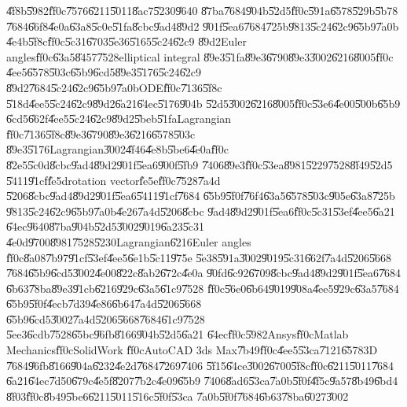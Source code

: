 \documentclass[12pt,a4paper]{article}
\begin{document}
\U{4f8b}\U{5982}\U{ff0c}\U{7576}\U{6211}\U{5011}\U{8ac7}\U{5230}\U{9640}%
\U{87ba}\U{7684}\U{904b}\U{52d5}\U{ff0c}\U{591a}\U{6578}\U{529b}\U{5b78}%
\U{7684}\U{66f8}\U{4e0a}\U{63a8}\U{5c0e}\U{51fa}\U{8cbc}\U{9ad4}\U{89d2}%
\U{901f}\U{5ea6}\U{7684}\U{725b}\U{9813}\U{5c24}\U{62c9}\U{65b9}\U{7a0b}%
\U{4e4b}\U{5f8c}\U{ff0c}\U{5c31}\U{6703}\U{5e36}\U{5165}\U{5c24}\U{62c9}%
\U{89d2}Euler angles\U{ff0c}\U{63a5}\U{8457}\U{7528}elliptical integral%
\U{89e3}\U{51fa}\U{89e3}\U{6790}\U{89e3}\U{3002}\U{6216}\U{8005}\U{ff0c}%
\U{4ee5}\U{6578}\U{503c}\U{65b9}\U{6cd5}\U{89e3}\U{5176}\U{5c24}\U{62c9}%
\U{89d2}\U{7684}\U{5c24}\U{62c9}\U{65b9}\U{7a0b}ODE\U{ff0c}\U{7136}\U{5f8c}%
\U{518d}\U{4ee5}\U{5c24}\U{62c9}\U{89d2}\U{6a21}\U{64ec}\U{5176}\U{904b}%
\U{52d5}\U{3002}\U{6216}\U{8005}\U{ff0c}\U{53e6}\U{4e00}\U{500b}\U{65b9}%
\U{6cd5}\U{662f}\U{4ee5}\U{5c24}\U{62c9}\U{89d2}\U{5beb}\U{51fa}Lagrangian%
\U{ff0c}\U{7136}\U{5f8c}\U{89e3}\U{6790}\U{89e3}\U{6216}\U{6578}\U{503c}%
\U{89e3}\U{5176}Lagrangian\U{3002}\U{4f46}\U{4e8b}\U{5be6}\U{4e0a}\U{ff0c}%
\U{82e5}\U{5c0d}\U{8cbc}\U{9ad4}\U{89d2}\U{901f}\U{5ea6}\U{900f}\U{5fb9}%
\U{7406}\U{89e3}\U{ff0c}\U{53ea}\U{8981}\U{5229}\U{7528}\U{8f49}\U{52d5}%
\U{5411}\U{91cf}\U{fe5d}rotation vector\U{fe5e}\U{ff0c}\U{7528}\U{7a4d}%
\U{5206}\U{8cbc}\U{9ad4}\U{89d2}\U{901f}\U{5ea6}\U{5411}\U{91cf}\U{7684}%
\U{65b9}\U{5f0f}\U{76f4}\U{63a5}\U{6578}\U{503c}\U{905e}\U{63a8}\U{725b}%
\U{9813}\U{5c24}\U{62c9}\U{65b9}\U{7a0b}\U{4e26}\U{7a4d}\U{5206}\U{8cbc}%
\U{9ad4}\U{89d2}\U{901f}\U{5ea6}\U{ff0c}\U{5c31}\U{53ef}\U{4ee5}\U{6a21}%
\U{64ec}\U{9640}\U{87ba}\U{904b}\U{52d5}\U{3002}\U{9019}\U{6a23}\U{5c31}%
\U{4e0d}\U{9700}\U{8981}\U{7528}\U{5230}Lagrangian\U{6216}Euler angles%
\U{ff0c}\U{8a08}\U{7b97}\U{91cf}\U{53ef}\U{4ee5}\U{6e1b}\U{5c11}\U{975e}%
\U{5e38}\U{591a}\U{3002}\U{9019}\U{5c31}\U{662f}\U{7a4d}\U{5206}\U{5668}%
\U{7684}\U{65b9}\U{6cd5}\U{3002}\U{4e00}\U{822c}\U{8ab2}\U{672c}\U{4e0a}%
\U{90fd}\U{6c92}\U{6709}\U{8cbc}\U{9ad4}\U{89d2}\U{901f}\U{5ea6}\U{7684}%
\U{6b63}\U{78ba}\U{89e3}\U{91cb}\U{6216}\U{929c}\U{63a5}\U{61c9}\U{7528}%
\U{ff0c}\U{56e0}\U{6b64}\U{9019}\U{908a}\U{4ee5}\U{929c}\U{63a5}\U{7684}%
\U{65b9}\U{5f0f}\U{4ecb}\U{7d39}\U{4e86}\U{6b64}\U{7a4d}\U{5206}\U{5668}%
\U{65b9}\U{6cd5}\U{3002}\U{7a4d}\U{5206}\U{5668}\U{7684}\U{61c9}\U{7528}%
\U{5ee3}\U{6cdb}\U{7528}\U{65bc}\U{96fb}\U{8166}\U{904b}\U{52d5}\U{6a21}%
\U{64ec}\U{ff0c}\U{5982}Ansys\U{ff0c}Matlab Mechanics\U{ff0c}SolidWork%
\U{ff0c}AutoCAD 3ds Max\U{7b49}\U{ff0c}\U{4ee5}\U{53ca}\U{7121}\U{6578}3D%
\U{7684}\U{96fb}\U{8166}\U{904a}\U{6232}\U{4e2d}\U{7684}\U{7269}\U{7406}%
\U{5f15}\U{64ce}\U{3002}\U{6700}\U{5f8c}\U{ff0c}\U{6211}\U{5011}\U{7684}%
\U{6a21}\U{64ec}\U{7d50}\U{679c}\U{4e5f}\U{8207}\U{7b2c}\U{4e09}\U{65b9}%
\U{7406}\U{8ad6}\U{53ca}\U{7a0b}\U{5f0f}\U{4f5c}\U{9a57}\U{8b49}\U{6bd4}%
\U{8f03}\U{ff0c}\U{8b49}\U{5be6}\U{6211}\U{5011}\U{516c}\U{5f0f}\U{53ca}%
\U{7a0b}\U{5f0f}\U{7684}\U{6b63}\U{78ba}\U{6027}\U{3002}
\end{document}
